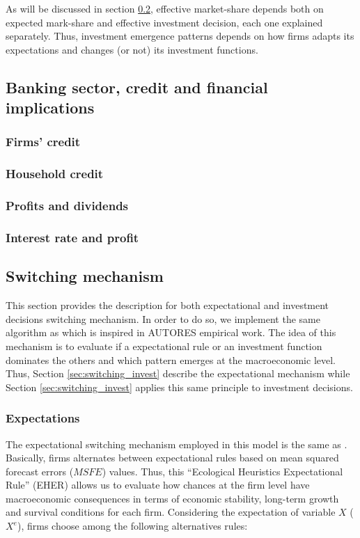 \documentclass{SelfArx}
\begin{document}
As will be discussed in section \ref{sec:switching}, effective market-share depends both on expected mark-share and effective investment decision, each one explained separately.
Thus, investment emergence patterns depends on how firms adapts its expectations and changes (or not) its investment functions.

\subsection{Banking sector, credit and financial implications}
\label{sec:banking}
\subsubsection{Firms' credit}
\label{sec:org97e03e0}

\subsubsection{Household credit}
\label{sec:org1043186}

\subsubsection{Profits and dividends}
\label{sec:org1d2f5aa}

\subsubsection{Interest rate and profit}
\label{sec:orgf06db82}

\subsection{Switching mechanism}
\label{sec:switching}
This section provides the description for both expectational and investment decisions switching mechanism.
In order to do so, we implement the same algorithm as \textcite{dosi_2020_RATIONAL,reissl_2021_Heterogeneousa} which is inspired in AUTORES empirical work.
The idea of this mechanism is to evaluate if a expectational rule or an investment function dominates the others and which pattern emerges at the macroeconomic level.
Thus, Section \ref{sec:switching_invest} describe the expectational mechanism while Section \ref{sec:switching_invest} applies this same principle to investment decisions.

\subsubsection{Expectations}
\label{sec:switching_expec}
The expectational switching mechanism employed in this model is the same as \textcite{dosi_2020_RATIONAL,reissl_2021_Heterogeneousa}.
Basically, firms alternates between expectational rules based on mean squared forecast errors (\(MSFE\)) values.
Thus, this ``Ecological Heuristics Expectational Rule'' (EHER) allows us to evaluate how chances at the firm level have macroeconomic consequences in terms of economic stability, long-term growth and survival conditions for each firm.
Considering the expectation of variable \(X\) (\(X^{e}\)), firms choose among the following alternatives rules:
\end{document}
